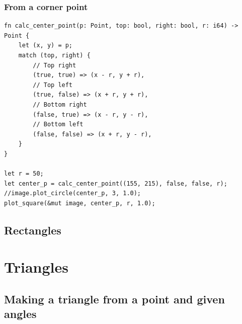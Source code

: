 \documentclass[12pt,openany,a4,usenames,dvipsnames]{book}
\begin{document}
\subsection{From a corner point}
\begin{verbatim}
fn calc_center_point(p: Point, top: bool, right: bool, r: i64) -> Point {
    let (x, y) = p;
    match (top, right) {
        // Top right
        (true, true) => (x - r, y + r),
        // Top left
        (true, false) => (x + r, y + r),
        // Bottom right
        (false, true) => (x - r, y - r),
        // Bottom left
        (false, false) => (x + r, y - r),
    }
}

let r = 50;
let center_p = calc_center_point((155, 215), false, false, r);
//image.plot_circle(center_p, 3, 1.0);
plot_square(&mut image, center_p, r, 1.0);
\end{verbatim}
\section{Rectangles}
\skelpar%
\chapter{Triangles}
\skelpar%
\section{Making a triangle from a point and given angles}
\skelpar%
\begin{verbatim}
\end{verbatim}
\end{document}
